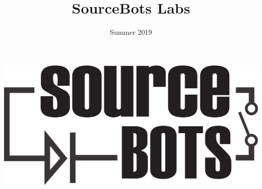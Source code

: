 \documentclass[a4paper,10pt]{article}
\title{{\titlefont SourceBots Labs}}
\date{Summer 2019}
\begin{document}
  \begin{titlepage}
    \maketitle
    \begin{center}
      \includegraphics[width=\textwidth]{img/SourceBots.png}      
    \end{center}
  \end{titlepage}
  
  
  
  
  
  
  
\end{document}
